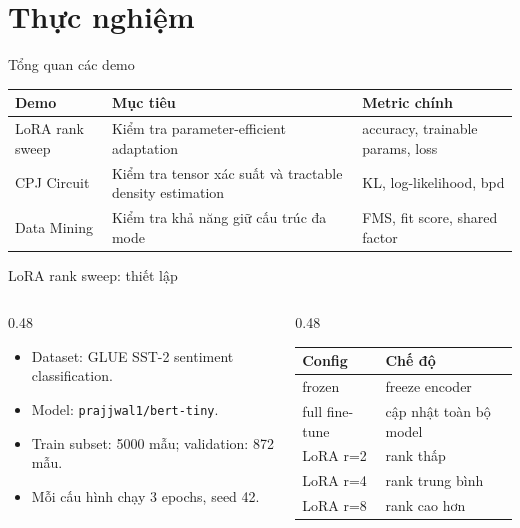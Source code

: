 \section{Thực nghiệm}

\begin{frame}{Tổng quan các demo}
\centering
\small
\renewcommand{\arraystretch}{1.3}
\begin{tabular}{>{\raggedright\arraybackslash}p{}>{\raggedright\arraybackslash}p{}>{\raggedright\arraybackslash}p{}}
\toprule
\textbf{Demo} & \textbf{Mục tiêu} & \textbf{Metric chính} \\
\midrule
LoRA rank sweep & Kiểm tra parameter-efficient adaptation & accuracy, trainable params, loss \\
CPJ Circuit & Kiểm tra tensor xác suất và tractable density estimation & KL, log-likelihood, bpd \\
Data Mining & Kiểm tra khả năng giữ cấu trúc đa mode & FMS, fit score, shared factor \\
\bottomrule
\end{tabular}
\end{frame}

\begin{frame}{LoRA rank sweep: thiết lập}
\begin{columns}[T,totalwidth=\textwidth]
    \begin{column}{0.48\textwidth}
        \begin{itemize}
            \item Dataset: GLUE SST-2 sentiment classification.
            \item Model: \texttt{prajjwal1/bert-tiny}.
            \item Train subset: 5000 mẫu; validation: 872 mẫu.
            \item Mỗi cấu hình chạy 3 epochs, seed 42.
        \end{itemize}
    \end{column}
    \begin{column}{0.48\textwidth}
        \small
        \renewcommand{\arraystretch}{1.1}
        \begin{tabular}{ll}
        \toprule
        \textbf{Config} & \textbf{Chế độ} \\
        \midrule
        frozen & freeze encoder \\
        full fine-tune & cập nhật toàn bộ model \\
        LoRA r=2 & rank thấp \\
        LoRA r=4 & rank trung bình \\
        LoRA r=8 & rank cao hơn \\
        \bottomrule
        \end{tabular}
    \end{column}
\end{columns}
\end{frame}

